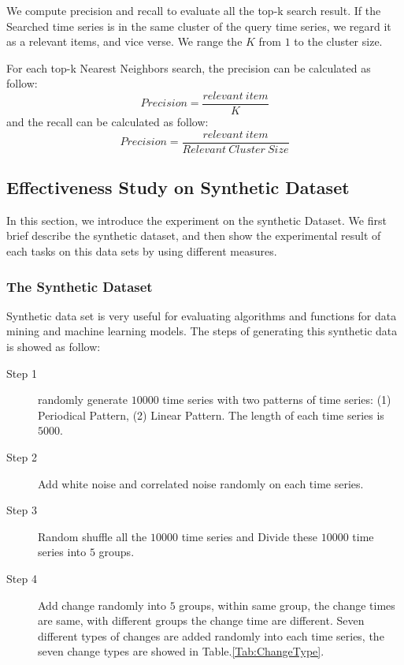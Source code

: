 We compute precision and recall \cite{powers2011evaluation} to evaluate all the top-k search result.
If the Searched time series is in the same cluster of the query time series, we regard it as a relevant items, and vice verse. We range the $K$ from $1$ to the cluster size. 

For each top-k Nearest Neighbors search, the precision can be calculated as follow:
\[Precision =\frac{relevant~item}{K} \]
and the recall can be calculated as follow:
\[
Precision =\frac{relevant~item}{Relevant~Cluster~Size} 
\]

\subsection{Effectiveness Study on Synthetic Dataset}

In this section, we introduce the experiment on the synthetic Dataset.
We first brief describe the synthetic dataset, and then show the experimental result of each tasks on this data sets by using different measures.

\subsubsection{The Synthetic Dataset}

Synthetic data set is very useful for evaluating algorithms and functions for data mining and machine learning models\cite{han2011data}. The steps of generating this synthetic data is showed as follow:

\begin{description}
  \item[Step 1] randomly generate $10000$ time series with two patterns of time series: (1) Periodical Pattern, (2) Linear Pattern. The length of each time series is $5000$. 
  \item[Step 2] Add white noise and correlated noise randomly \cite{han2011data} on each time series.
  \item[Step 3] Random shuffle all the $10000$ time series and Divide these $10000$ time series into $5$ groups.
  \item[Step 4] Add change randomly into $5$ groups, within same group, the change times are same, with different groups the change time are different. Seven different types of changes are added randomly into each time series, the seven change types are showed in Table.\ref{Tab:ChangeType}.
\end{description}

